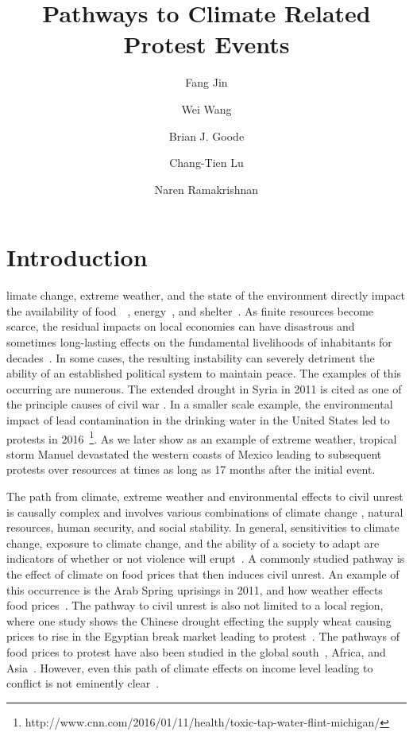 \documentclass[9pt,twocolumn,twoside]{pnas-new}
\title{Pathways to Climate Related Protest Events}
\author[a,1]{Fang Jin}
\author[a]{Wei Wang}
\author[a]{Brian J. Goode}
\author[a]{Chang-Tien Lu}
\author[a]{Naren Ramakrishnan}
\affil[a]{Discovery Analytics Center (Dept. of Computer Science), Virginia Tech - NCR, Arlington, VA 22203}
\begin{document}
\verticaladjustment{-2pt}

\maketitle
\thispagestyle{firststyle}
\section{Introduction}
limate change, extreme weather, and the state of the environment directly impact the availability of food~\cite{RW3}~\cite{akil2014effects}, energy~\cite{mitigation2011ipcc}, and shelter~\cite{warner2009search}.
As finite resources become scarce, the residual impacts on local economies can have disastrous and sometimes long-lasting effects on the fundamental livelihoods of inhabitants for decades~\cite{le2001political}.
In some cases, the resulting instability can severely detriment the ability of an established political system to maintain peace.
The examples of this occurring are numerous.
The extended drought in Syria in 2011 is cited as one of the principle causes of civil war \cite{gleick2014water,kelley2015climate}.
In a smaller scale example, the environmental impact of lead contamination in the drinking water in the United States led to protests in 2016~\footnote{http://www.cnn.com/2016/01/11/health/toxic-tap-water-flint-michigan/}.
As we later show as an example of extreme weather, tropical storm Manuel devastated the western coasts of Mexico leading to subsequent protests over resources at times as long as 17 months after the initial event.


The path from climate, extreme weather and environmental effects to civil unrest is causally complex \cite{hsiang2011civil,RW5} and involves various combinations of climate change \cite{burke2014climate}, natural resources, human security, and social stability.
In general, sensitivities to climate change, exposure to climate change, and the ability of a society to adapt are indicators of whether or not violence will erupt~\cite{RW9}.
A commonly studied pathway is the effect of climate on food prices that then induces civil unrest.
An example of this occurrence is the Arab Spring uprisings in 2011, and how weather effects food prices~\cite{RW2}.
The pathway to civil unrest is also not limited to a local region, where one study shows the Chinese drought effecting the supply wheat causing prices to rise in the Egyptian break market leading to protest~\cite{RW1}.
The pathways of food prices to protest have also been studied in the global south~\cite{RW4}, Africa, and Asia~\cite{wischnath2014climate,RW6}.
However, even this path of climate effects on income level leading to conflict is not eminently clear~\cite{RW10}.
\end{document}
